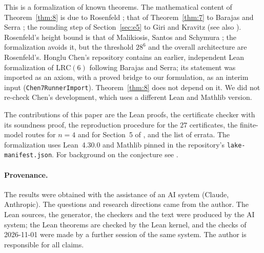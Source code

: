 \documentclass[11pt]{amsart}
\theoremstyle{plain}
\theoremstyle{definition}
\theoremstyle{remark}
\newcommand{\lean}[1]{{\def\_{\textunderscore\allowbreak}\def\.{.\allowbreak}\texttt{#1}}}
\newcommand{\LRC}{\mathrm{LRC}}
\begin{document}
This is a formalization of known theorems. The mathematical content of Theorem~\ref{thm:8} is due to
Rosenfeld \cite{ros8}; that of Theorem~\ref{thm:7} to Barajas and Serra \cite{bs}; the rounding
step of Section~\ref{sec:e5} to Giri and Kravitz \cite{gk} (see also \cite{allikvere}). Rosenfeld's
height bound is that of Malikiosis, Santos and Schymura \cite{mss}; the formalization avoids it,
but the threshold $28^6$ and the overall architecture are Rosenfeld's. Honglu Chen's repository
\cite{chen} contains an earlier, independent Lean formalization of $\LRC(6)$ following Barajas and
Serra; its statement was imported as an axiom, with a proved bridge to our
formulation, as an interim input (\lean{Chen7RunnerImport}). Theorem~\ref{thm:8} does not depend on
it. We did not re-check Chen's development, which uses a different Lean and Mathlib version.

The contributions of this paper are the Lean proofs, the certificate checker with its soundness
proof, the reproduction procedure for the $27$ certificates, the finite-model routes for $n=4$ and
for Section~5 of \cite{bs}, and the list of errata. The formalization uses Lean~4.30.0 and Mathlib
\cite{mathlib} pinned in the repository's \texttt{lake-manifest.json}. For background on the
conjecture see \cite{cp,tao,kravitz,ps}.

\paragraph{Provenance.} The results were obtained with the assistance of an AI system (Claude, Anthropic). The
questions and research directions came from the author. The Lean sources, the generator, the checkers and the
text were produced by the AI system; the Lean theorems are checked by the Lean kernel, and the checks of
2026-11-01 were made by a further session of the same system. The author is responsible for all claims.



\end{document}
